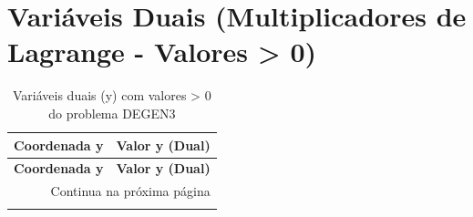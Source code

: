 \documentclass[12pt]{article}
\begin{document}
\section{Variáveis Duais (Multiplicadores de Lagrange - Valores > 0)}

\begin{longtable}{@{}cc@{}}
\caption{Variáveis duais (y) com valores > 0 do problema DEGEN3} \\
\toprule
\textbf{Coordenada y} & \textbf{Valor y (Dual)} \\
\midrule
\endfirsthead

\toprule
\textbf{Coordenada y} & \textbf{Valor y (Dual)} \\
\midrule
\endhead

\midrule \multicolumn{2}{r}{{Continua na próxima página}} \\ \midrule
\endfoot


\end{longtable}
\end{document}
